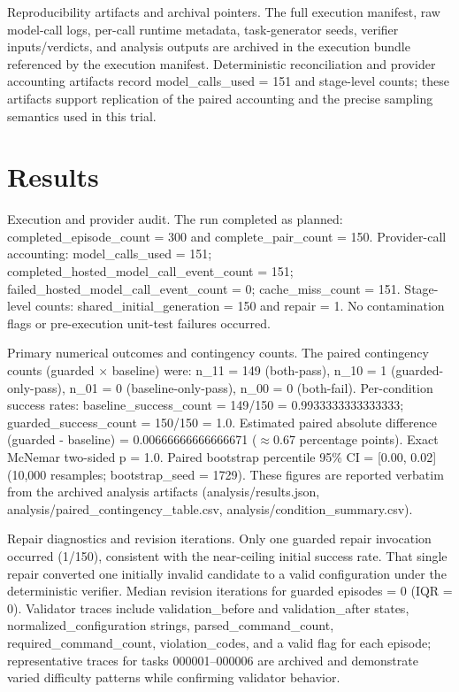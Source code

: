 \documentclass[conference]{IEEEtran}
\begin{document}
Reproducibility artifacts and archival pointers. The full execution manifest, raw model-call logs, per-call runtime metadata, task-generator seeds, verifier inputs/verdicts, and analysis outputs are archived in the execution bundle referenced by the execution manifest. Deterministic reconciliation and provider accounting artifacts record model\_calls\_used = 151 and stage-level counts; these artifacts support replication of the paired accounting and the precise sampling semantics used in this trial.

\section{Results}
Execution and provider audit. The run completed as planned: completed\_episode\_count = 300 and complete\_pair\_count = 150. Provider-call accounting: model\_calls\_used = 151; completed\_hosted\_model\_call\_event\_count = 151; failed\_hosted\_model\_call\_event\_count = 0; cache\_miss\_count = 151. Stage-level counts: shared\_initial\_generation = 150 and repair = 1. No contamination flags or pre-execution unit-test failures occurred.

Primary numerical outcomes and contingency counts. The paired contingency counts (guarded \ensuremath{\times} baseline) were: n\_11 = 149 (both-pass), n\_10 = 1 (guarded-only-pass), n\_01 = 0 (baseline-only-pass), n\_00 = 0 (both-fail). Per-condition success rates: baseline\_success\_count = 149/150 = 0.9933333333333333; guarded\_success\_count = 150/150 = 1.0. Estimated paired absolute difference (guarded - baseline) = 0.00666666666666671 (\ensuremath{\approx}0.67 percentage points). Exact McNemar two-sided p = 1.0. Paired bootstrap percentile 95\% CI = [0.00, 0.02] (10,000 resamples; bootstrap\_seed = 1729). These figures are reported verbatim from the archived analysis artifacts (analysis/results.json, analysis/paired\_contingency\_table.csv, analysis/condition\_summary.csv).

Repair diagnostics and revision iterations. Only one guarded repair invocation occurred (1/150), consistent with the near-ceiling initial success rate. That single repair converted one initially invalid candidate to a valid configuration under the deterministic verifier. Median revision iterations for guarded episodes = 0 (IQR = 0). Validator traces include validation\_before and validation\_after states, normalized\_configuration strings, parsed\_command\_count, required\_command\_count, violation\_codes, and a valid flag for each episode; representative traces for tasks 000001--000006 are archived and demonstrate varied difficulty patterns while confirming validator behavior.
\end{document}

